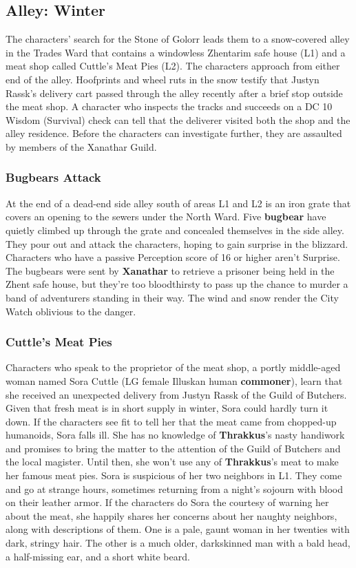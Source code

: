 \documentclass[10pt,a4paper,twoside,twocolumn,openany,nodeprecatedcode]{dndbook}
\begin{document}
\subsection{Alley: Winter}
The characters' search for the Stone of Golorr leads them to a snow-covered alley in the Trades Ward that contains a windowless Zhentarim safe house (L1) and a meat shop called Cuttle's Meat Pies (L2).
The characters approach from either end of the alley. Hoofprints and wheel ruts in the snow testify that Justyn Rassk's delivery cart passed through the alley recently after a brief stop outside the meat shop. A character who inspects the tracks and succeeds on a DC 10 Wisdom (Survival) check can tell that the deliverer visited both the shop and the alley residence. Before the characters can investigate further, they are assaulted by members of the Xanathar Guild.
\subsubsection{Bugbears Attack}
At the end of a dead-end side alley south of areas L1 and L2 is an iron grate that covers an opening to the sewers under the North Ward. Five \textbf{bugbear} have quietly climbed up through the grate and concealed themselves in the side alley. They pour out and attack the characters, hoping to gain surprise in the blizzard. Characters who have a passive Perception score of 16 or higher aren't Surprise.
The bugbears were sent by \textbf{Xanathar} to retrieve a prisoner being held in the Zhent safe house, but they're too bloodthirsty to pass up the chance to murder a band of adventurers standing in their way. The wind and snow render the City Watch oblivious to the danger.
\subsubsection{Cuttle's Meat Pies}
Characters who speak to the proprietor of the meat shop, a portly middle-aged woman named Sora Cuttle (LG female Illuskan human \textbf{commoner}), learn that she received an unexpected delivery from Justyn Rassk of the Guild of Butchers. Given that fresh meat is in short supply in winter, Sora could hardly turn it down. If the characters see fit to tell her that the meat came from chopped-up humanoids, Sora falls ill. She has no knowledge of \textbf{Thrakkus}'s nasty handiwork and promises to bring the matter to the attention of the Guild of Butchers and the local magister. Until then, she won't use any of \textbf{Thrakkus}'s meat to make her famous meat pies.
Sora is suspicious of her two neighbors in L1. They come and go at strange hours, sometimes returning from a night's sojourn with blood on their leather armor. If the characters do Sora the courtesy of warning her about the meat, she happily shares her concerns about her naughty neighbors, along with descriptions of them. One is a pale, gaunt woman in her twenties with dark, stringy hair. The other is a much older, darkskinned man with a bald head, a half-missing ear, and a short white beard.
\end{document}
